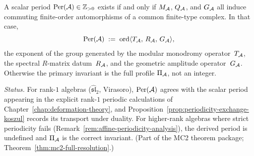 \begin{definition}
\label{def:derived-scalar-period}
A scalar period $\operatorname{Per}(\mathcal{A}) \in \mathbb{Z}_{>0}$ exists if and
only if $M_{\mathcal{A}}$, $Q_{\mathcal{A}}$, and $G_{\mathcal{A}}$ all induce commuting
finite-order automorphisms of a common finite-type complex.
In that case,
\[
\operatorname{Per}(\mathcal{A})
\;:=\;
\operatorname{ord}\langle T_{\mathcal{A}},\, R_{\mathcal{A}},\, G_{\mathcal{A}} \rangle,
\]
the exponent of the group generated by the modular monodromy
operator~$T_{\mathcal{A}}$, the spectral $R$-matrix datum~$R_{\mathcal{A}}$,
and the geometric amplitude operator~$G_{\mathcal{A}}$.
Otherwise the primary invariant is the full profile
$\Pi_{\mathcal{A}}$, not an integer.

\smallskip\noindent
\emph{Status.}
For rank-$1$ algebras ($\widehat{\mathfrak{sl}}_2$, Virasoro),
$\operatorname{Per}(\mathcal{A})$ agrees with the scalar period appearing in the explicit
rank-$1$ periodic calculations of
Chapter~\ref{chap:deformation-theory}, and
Proposition~\ref{prop:periodicity-exchange-koszul} records its transport
under duality.  For
higher-rank algebras where strict periodicity fails
(Remark~\ref{rem:affine-periodicity-analysis}), the derived
period is undefined and $\Pi_{\mathcal{A}}$ is the correct invariant.
(Part of the MC2 theorem package; Theorem~\ref{thm:mc2-full-resolution}.)
\end{definition}

